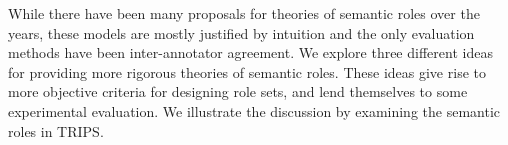 While there have been many proposals for theories of semantic roles over the years, these models are mostly justified by intuition and the only evaluation methods have been inter-annotator agreement. We explore three different ideas for providing more rigorous theories of semantic roles.  These ideas give rise to more objective criteria for designing role sets, and lend themselves to some experimental evaluation. We illustrate the discussion by examining the semantic roles in TRIPS.
